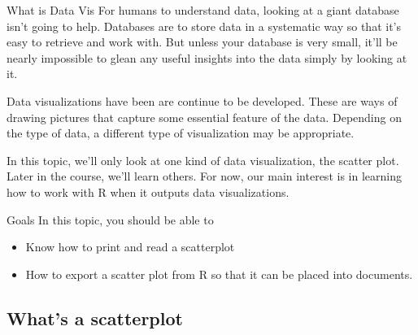 \documentclass[11pt]{amsart}
\renewcommand{\(}{\left(}
\renewcommand{\)}{\right)}
\newenvironment{notes}{%
	\begin{description}[style=nextline]%
		\setlength{\itemsep}{10pt}%
		\setlength{\parskip}{2pt}%
	}
        {
	\end{description}
}
\begin{document}
\begin{notes}
\item[What is Data Vis] 
	For humans to understand data, looking at a giant database isn't going to help.  Databases are to store data in a systematic way so that it's easy to retrieve and work with.  But unless your database is very small, it'll be nearly impossible to glean any useful insights into the data simply by looking at it.  
	
	Data visualizations have been are continue to be developed. These are ways of drawing pictures that capture some essential feature of the data.  Depending on the type of data, a different type of visualization may be appropriate.  
	
	In this topic, we'll only look at one kind of data visualization, the scatter plot.  Later in the course, we'll learn others. For now, our main interest is in learning how to work with R when it outputs data visualizations.
	
\item[Goals] 
	In this topic, you should be able to
	\begin{itemize}
		\item Know how to print and read a scatterplot
		\item How to export a scatter plot from R so that it can be placed into documents.
	\end{itemize}   
\end{notes}
 
\subsection{What's a scatterplot}
\end{document}
